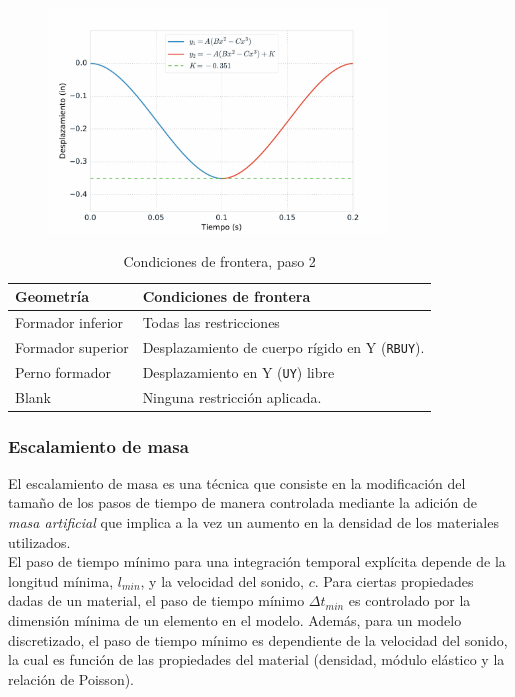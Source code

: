 \begin{figure}[H]
\centering
\includegraphics[width=0.8\textwidth]{src/ch3/smooth_displacement_02.pdf}
\label{fig:smooth_displacement_02}
\end{figure}

\begin{table}[H]
\centering
\caption{Condiciones de frontera, paso 2}
\label{}
\begin{tabular}{p{4cm} p{8cm}} \hline
Geometría &  Condiciones de frontera \\
\hline
Formador inferior        & Todas las restricciones   \\
Formador superior        & Desplazamiento de cuerpo rígido en Y (\texttt{RBUY}). \\
Perno formador           & Desplazamiento en Y (\texttt{UY}) libre  \\
Blank                    & Ninguna restricción aplicada. \\
\hline
\end{tabular}
\label{tab:bound_conds_02}
\end{table}


\subsubsection{Escalamiento de masa}\label{sec:mass-scaling}

El escalamiento de masa es una técnica que consiste en la modificación del tamaño de los 
pasos de tiempo de manera controlada mediante la adición de \textit{masa artificial} que implica 
a la vez un aumento en la densidad de los materiales utilizados.\\

El paso de tiempo mínimo para una integración temporal explícita depende de la longitud mínima, 
$l_{min}$, y la velocidad del sonido, $c$. Para ciertas propiedades dadas de un material, el 
paso de tiempo mínimo $\Delta t_{min}$ es controlado por la dimensión mínima de un elemento 
en el modelo. Además, para un modelo discretizado, el paso de tiempo mínimo es dependiente 
de la velocidad del sonido, la cual es función de las propiedades del material (densidad, 
módulo elástico y la relación de Poisson). ~\cite{lsdyna-ansys-manual} \\

